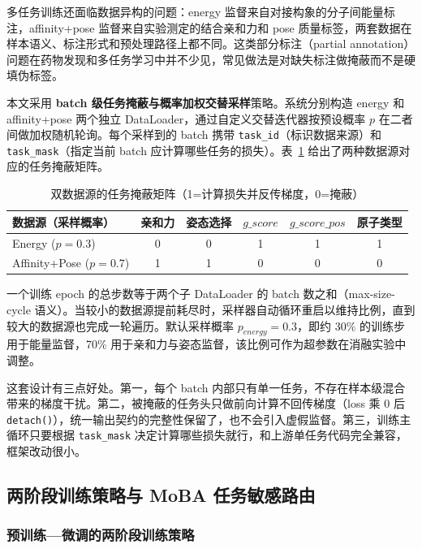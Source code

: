 多任务训练还面临数据异构的问题：energy 监督来自对接构象的分子间能量标注，affinity+pose 监督来自实验测定的结合亲和力和 pose 质量标签，两套数据在样本语义、标注形式和预处理路径上都不同。这类部分标注（partial annotation）问题在药物发现\cite{wu2018moleculenet}和多任务学习\cite{zhang2021survey}中并不少见，常见做法是对缺失标注做掩蔽而不是硬填伪标签。

本文采用 \textbf{batch 级任务掩蔽与概率加权交替采样}策略。系统分别构造 energy 和 affinity+pose 两个独立 DataLoader，通过自定义交替迭代器按预设概率 $p$ 在二者间做加权随机轮询。每个采样到的 batch 携带 \texttt{task\_id}（标识数据来源）和 \texttt{task\_mask}（指定当前 batch 应计算哪些任务的损失）。表~\ref{T.task_mask} 给出了两种数据源对应的任务掩蔽矩阵。

\begin{table}[htb]
  \centering
  \caption{双数据源的任务掩蔽矩阵（1=计算损失并反传梯度，0=掩蔽）}
  \label{T.task_mask}
  \small
  \begin{tabular}{lccccc}
    \toprule
    数据源（采样概率） & 亲和力 & 姿态选择 & $g\_score$ & $g\_score\_pos$ & 原子类型 \\
    \midrule
    Energy ($p=0.3$) & 0 & 0 & 1 & 1 & 1 \\
    Affinity+Pose ($p=0.7$) & 1 & 1 & 0 & 0 & 0 \\
    \bottomrule
  \end{tabular}
\end{table}

一个训练 epoch 的总步数等于两个子 DataLoader 的 batch 数之和（max-size-cycle 语义）。当较小的数据源提前耗尽时，采样器自动循环重启以维持比例，直到较大的数据源也完成一轮遍历。默认采样概率 $p_{energy} = 0.3$，即约 30\% 的训练步用于能量监督，70\% 用于亲和力与姿态监督，该比例可作为超参数在消融实验中调整。

这套设计有三点好处。第一，每个 batch 内部只有单一任务，不存在样本级混合带来的梯度干扰\cite{yu2020gradient}。第二，被掩蔽的任务头只做前向计算不回传梯度（loss 乘 0 后 \texttt{detach()}），统一输出契约的完整性保留了，也不会引入虚假监督。第三，训练主循环只要根据 \texttt{task\_mask} 决定计算哪些损失就行，和上游单任务代码完全兼容，框架改动很小。

\subsection{两阶段训练策略与 MoBA 任务敏感路由}

\subsubsection{预训练—微调的两阶段训练策略}

